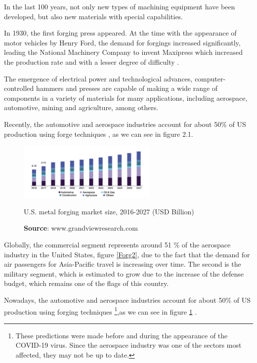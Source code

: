 In the last 100 years, not only new types of machining equipment have been developed, but also new materials with special capabilities.\par
In 1930, the first forging press appeared. At the time with the appearance of motor vehicles by Henry Ford, the demand for forgings increased significantly, leading the National Machinery Company to invent Maxipress which increased the production rate and with a lesser degree of difficulty \cite{azom}.\par
The emergence of electrical power and technological advances,  computer-controlled hammers and presses are capable of making a wide range of components in a variety of materials for many applications, including aerospace, automotive, mining and agriculture, among others.\par
Recently, the automotive and aerospace industries account for about 50\% of US production using forge techniques \cite{site2}, as we can see in figure 2.1.

\begin{figure}[h]
\centering
\includegraphics[width=0.6\textwidth]{./Images/Forgingindustry.png}
\caption{U.S. metal forging market size, 2016-2027 (USD Billion)}
\label{ForgingMarket}
\caption*{\textbf{Source}: www.grandviewresearch.com}
\end{figure}

Globally, the commercial segment represents around 51 \% of the aerospace industry in the United States, figure \ref{Forg2}, due to the fact that the demand for air passengers for Asia-Pacific travel is increasing over time. The second is the military segment, which is estimated to grow due to the increase of the defense budget, which remains one of the flags of this country\cite{market}.\par
Nowadays, the automotive and aerospace industries account for about 50\% of US production using forging techniques \footnote[]{These predictions were made before and during the appearance of the COVID-19 virus. Since the aerospace industry was one of the sectors most affected, they may not be up to date.\cite{hall2020beyond}},as we can see in figure \ref{ForgingMarket} \cite{market}.\par




